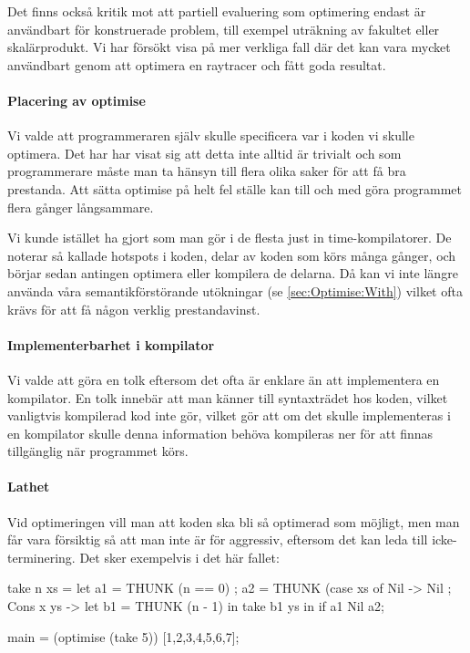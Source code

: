 \documentclass[Rapport]{subfiles}
\begin{document}
Det finns också kritik mot att partiell evaluering som optimering endast är användbart för konstruerade problem, till exempel uträkning av fakultet eller skalärprodukt. Vi har försökt visa på mer verkliga fall där det kan vara mycket användbart genom att optimera en raytracer och fått goda resultat. 


\paragraph{Placering av optimise}

Vi valde att programmeraren själv skulle  specificera var i koden vi skulle optimera. Det har har visat sig att detta inte alltid är trivialt och som programmerare måste man ta hänsyn till flera olika saker för att få bra prestanda. Att sätta optimise på helt fel ställe kan till och med göra programmet flera gånger långsammare.

Vi kunde istället ha gjort som man gör i de flesta just in time-kompilatorer. De noterar så kallade hotspots i koden, delar av koden som körs många gånger, och börjar sedan antingen optimera eller kompilera de delarna. Då kan vi inte längre använda våra semantikförstörande utökningar (se \ref{sec:Optimise:With}) vilket ofta krävs för att få någon verklig prestandavinst. 






\paragraph{Implementerbarhet i kompilator}
Vi valde att göra en tolk eftersom det ofta är enklare än att implementera en kompilator.
En tolk innebär att man känner till syntaxträdet hos koden, vilket vanligtvis kompilerad
kod inte gör, vilket gör att om det skulle implementeras i en kompilator skulle
denna information behöva kompileras ner för att finnas tillgänglig när programmet körs.


\paragraph{Lathet}
Vid optimeringen vill man att koden ska bli så optimerad som möjligt, men man får
vara försiktig så att man inte är för aggressiv, 
eftersom det kan leda till icke-terminering. Det sker exempelvis i det här fallet:

\begin{codeEx}
take n xs = let
    { a1 = THUNK (n == 0)
    ; a2 = THUNK (case xs of
        { Nil -> Nil
        ; Cons x ys -> let
            { b1 = THUNK (n - 1)
            } in take b1 ys
        }
    } in if a1 Nil a2;

main = (optimise (take 5)) [1,2,3,4,5,6,7];
\end{codeEx}
\end{document}
